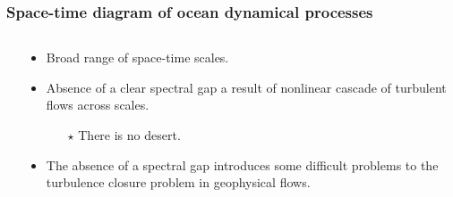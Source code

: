 \documentclass[10pt]{beamer}
\begin{document}
\begin{frame}
  \frametitle{Space-time diagram of ocean dynamical processes}

\begin{columns}[c] 
\begin{center}
\vspace{-.25cm}
\end{center}

\begin{exampleblock}{}
\begin{itemize}

\item Broad range of space-time scales.

\item Absence of a clear spectral gap a result of nonlinear cascade of
  turbulent flows across scales. 
   \begin{itemize}
      \item[$\star$] There is no desert.  
   \end{itemize}

\item The absence of a spectral gap introduces some difficult
   problems to the turbulence closure problem in geophysical flows.

\end{itemize}
\end{exampleblock}{}

\end{columns}
\end{frame}
\end{document}
